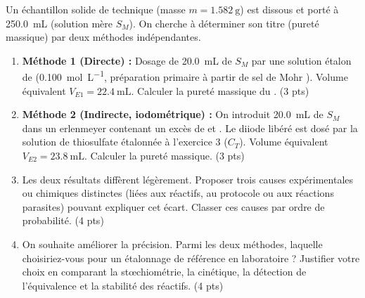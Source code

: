 \documentclass[11pt]{article}
\begin{document}
\begin{exercice}
Un échantillon solide de  technique (masse $m = \SI{1,582}{\g}$) est dissous et porté à \SI{250,0}{\mL} (solution mère $S_M$). On cherche à déterminer son titre (pureté massique) par deux méthodes indépendantes.
\begin{enumerate}
    \item \textbf{Méthode 1 (Directe) :} Dosage de \SI{20,0}{\mL} de $S_M$ par une solution étalon de  (\SI{0,100}{\mol\per\L}, préparation primaire à partir de sel de Mohr ). Volume équivalent $V_{E1} = \SI{22,4}{\mL}$. Calculer la pureté massique du . (3 pts)
    \item \textbf{Méthode 2 (Indirecte, iodométrique) :} On introduit \SI{20,0}{\mL} de $S_M$ dans un erlenmeyer contenant un excès de  et . Le diiode libéré est dosé par la solution de thiosulfate étalonnée à l'exercice 3 ($C_T$). Volume équivalent $V_{E2} = \SI{23,8}{\mL}$. Calculer la pureté massique. (3 pts)
    \item Les deux résultats diffèrent légèrement. Proposer trois causes expérimentales ou chimiques distinctes (liées aux réactifs, au protocole ou aux réactions parasites) pouvant expliquer cet écart. Classer ces causes par ordre de probabilité. (4 pts)
    \item On souhaite améliorer la précision. Parmi les deux méthodes, laquelle choisiriez-vous pour un étalonnage de référence en laboratoire ? Justifier votre choix en comparant la stœchiométrie, la cinétique, la détection de l'équivalence et la stabilité des réactifs. (4 pts)
\end{enumerate}
\end{exercice}
\end{document}
